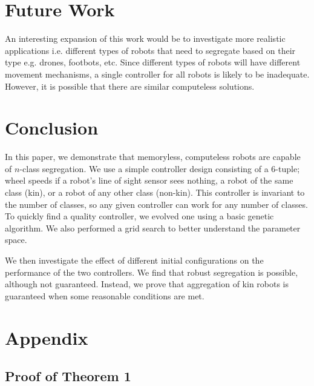 \documentclass[conference]{IEEEtran}
\begin{document}
\section{Future Work}

  An interesting expansion of this work would be to investigate more realistic applications i.e. different types of robots that need to segregate based on their type e.g. drones, footbots, etc. Since different types of robots will have different movement mechanisms, a single controller for all robots is likely to be inadequate. However, it is possible that there are similar computeless solutions.

\section{Conclusion}

  In this paper, we demonstrate that memoryless, computeless robots are capable of $n$-class segregation. We use a simple controller design consisting of a 6-tuple; wheel speeds if a robot's line of sight sensor sees nothing, a robot of the same class (kin), or a robot of any other class (non-kin). This controller is invariant to the number of classes, so any given controller can work for any number of classes. To quickly find a quality controller, we evolved one using a basic genetic algorithm. We also performed a grid search to better understand the parameter space.

  We then investigate the effect of different initial configurations on the performance of the two controllers. We find that robust segregation is possible, although not guaranteed. Instead, we prove that aggregation of kin robots is guaranteed when some reasonable conditions are met.




\onecolumn
\appendix
\section{Appendix}

  \subsection{Proof of Theorem 1} \label{thm:1}
\end{document}
